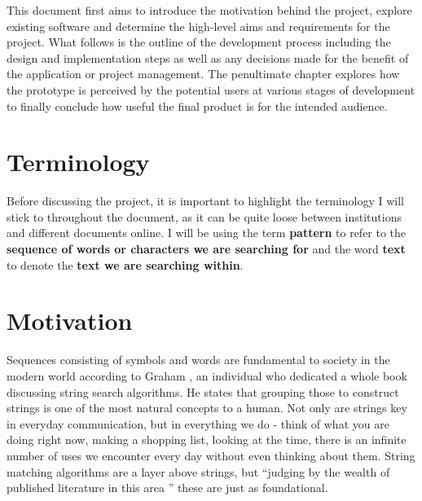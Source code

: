 \documentclass{l4proj}
\begin{document}
This document first aims to introduce the motivation behind the project,  explore existing software and determine the high-level aims and requirements for the project. What follows is the outline of the development process including the design and implementation steps as well as any decisions made for the benefit of the application or project management. The penultimate chapter explores how the prototype is perceived by the potential users at various stages of development to finally conclude how useful the final product is for the intended audience.


\section{Terminology}

Before discussing the project, it is important to highlight the terminology I will stick to throughout the document, as it can be quite loose between institutions and different documents online.  I will be using the term \textbf{pattern} to refer to the \textbf{sequence of words or characters we are searching for} and the word \textbf{text} to denote the \textbf{text we are searching within}.

\section{Motivation}

Sequences consisting of symbols and words are fundamental to society in the modern world according to Graham \citet{Stephen_1994}, an individual who dedicated a whole book discussing string search algorithms. He states that grouping those to construct strings is one of the most natural concepts to a human. Not only are strings key in everyday communication, but in everything we do - think of what you are doing right now, making a shopping list, looking at the time, there is an infinite number of uses we encounter every day without even thinking about them.  String matching algorithms are a layer above strings, but ``judging by the wealth of published literature in this area \citep{Stephen_1994}'' these are just as foundational.
\end{document}
